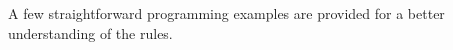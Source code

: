 \begin{comment}
\todo[inline]{Tirar texto?}
The rule (ax) states that if there is a function $f \in \Sigma$ that has type $\mathbb{A}_1, \ldots, \mathbb{A}_n \rightarrow \mathbb{A}$ and a set of variables $v_1,\ldots, v_n$ whose types match the type of the arguments of $f$, then if that function is applied to $v_1,…,v_n$ the respective result is of type $\mathbb{A}$.
The rule (hyp) is a tautology: under the assumption that $x$ has type $\mathbb{A}$, $x$ has type $\mathbb{A}$. 
The rule ($\mathbb{I}_{i}$) asserts that the unit element $*$ always has type $\mathbb{I}$. 
The rule ($\multimap_i$) expresses that if $v$ is a term of type $\mathbb{B}$ with a variable $x$ of type $\mathbb{A}$, then $\lambda x:\mathbb{A} . v$ is a function of type $\mathbb{A} \multimap \mathbb{B} $. 
The rule $(\multimap_e)$ states that a function of type $\mathbb{A} \multimap \mathbb{B}$ can be applied to an argument of type $\mathbb{A}$ to produce a result of type $\mathbb{B}$. 
The rule $(\mathbb{\otimes}_i)$ asserts that if there is a term $v$ of type $\mathbb{A}$ and a term $w$ of type $\mathbb{B}$,  then the tensor of these terms is of type $\mathbb{A} \otimes \mathbb{B}$.
The rule $(\mathbb{\otimes}_e)$ expresses if there is a term $w$ of type $\mathbb{D}$ with variables $x$ and $y$ of types $\mathbb{A}$ and $\mathbb{B}$, respectively, and a term $v$ of type $\mathbb{A} \otimes \mathbb{B}$, then $v$ can be deconstructed into $x \otimes y$. 
The rule $(\mathbb{I}_e)$ states that if there is a term $w$ of type $\mathbb{A}$ and a term $v$ of type $\mathbb{I}$, then $v$ can be discarded, and only the term $w$ remains. 
The rule $(\text{inl}_\typeB)$ (resp. $(\text{inr}_\typeA)$) states that if we inject a term $v$ of type $\typeA$ (resp. $\typeB$) into $\typeA \oplus \typeB$ we obtain a term of type $\typeA$ or $\typeB$. 
Finally, the rule $\text{(case)}$ states that if there are two programs of type $\typeD$ to be executed depending on the value of a term $v$ of type $\typeA \oplus \typeB$ (whose right and left components are assigned to variables $x$ and $y$, respectively), then the resulting program also has type $\typeD$.
\end{comment}
 



A few straightforward programming examples are provided for a better understanding of the rules.  

